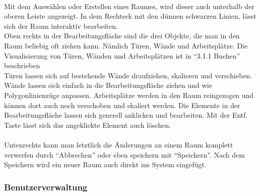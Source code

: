 \paragraph{}Mit dem Auswählen oder Erstellen eines Raumes, wird dieser auch unterhalb der oberen Leiste angezeigt. 
In dem Rechteck mit den dünnen schwarzen Linien, lässt sich der Raum interaktiv bearbeiten.
\\
Oben rechts in der Bearbeitungsfläche sind die drei Objekte, die man in den Raum beliebig oft ziehen kann.
Nämlich Türen, Wände und Arbeitsplätze.
Die Visualisierung von Türen, Wänden und Arbeitsplätzen ist in "`3.1.1 Buchen"' beschrieben
\\
Türen lassen sich auf bestehende Wände draufziehen, skalieren und verschieben.
Wände lassen sich einfach in die Bearbeitungsfläche ziehen und wie Polygonlinienzüge anpassen.
Arbeitsplätze werden in den Raum reingezogen und können dort auch noch verschoben und skaliert werden.
Die Elemente in der Bearbeitungsfläche lassen sich generell anklicken und bearbeiten.
Mit der Entf. Taste lässt sich das angeklickte Element auch löschen.

\paragraph{} Untenrechts kann man letztlich die Änderungen an einem Raum komplett verwerfen durch "`Abbrechen"'
oder eben speichern mit "`Speichern"'.
Nach dem Speichern wird ein neuer Raum auch direkt ins System eingefügt.

\subsubsection{Benutzerverwaltung}